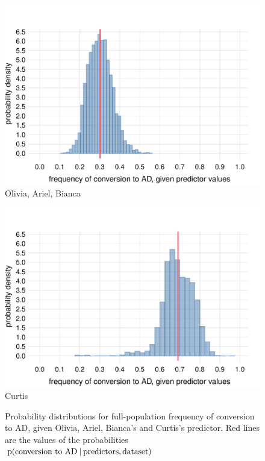 \documentclass[utf8]{FrontiersinHarvard} %
\newcommand*{\p}{\mathrm{p}}%
\renewcommand*{\|}[1][]{\nonscript\:#1\vert\nonscript\:\mathopen{}}
\begin{document}
\begin{figure}[!t]%
  \centering%
  \begin{minipage}{0.49\linewidth}\centering
    \includegraphics[width=\linewidth]{directprob_olivia.pdf}\\
    \footnotesize Olivia, Ariel, Bianca
  \end{minipage}
  \hfill
  \begin{minipage}{0.49\linewidth}\centering
    \includegraphics[width=\linewidth]{directprob_curtis.pdf}\\
    \footnotesize Curtis
  \end{minipage}
  \caption{Probability distributions for full-population frequency of conversion to AD, given Olivia, Ariel, Bianca's and Curtis's predictor. Red lines are the values of the probabilities  $\p(\text{conversion to AD} \| \text{predictors}, \text{dataset})$}\label{fig:freq_distribution_patients}
\end{figure}%
\end{document}
